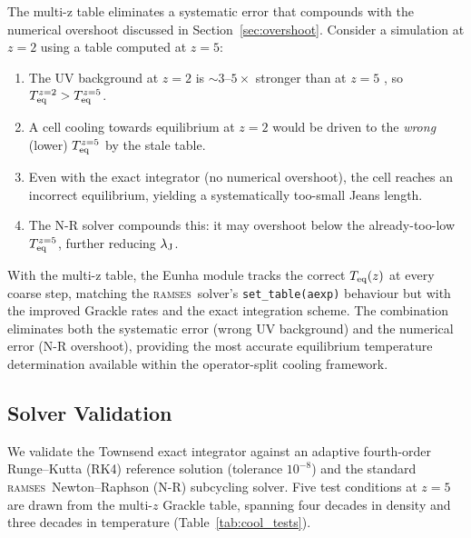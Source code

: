 \documentclass[fleqn,usenatbib]{mnras}
\newcommand{\lJ}{\lambda_{\rm J}}
\newcommand{\ramses}{\textsc{ramses}}
\newcommand{\code}[1]{\texttt{#1}}
\begin{document}
The multi-z table eliminates a systematic error that compounds with the
numerical overshoot discussed in Section~\ref{sec:overshoot}.  Consider
a simulation at $z = 2$ using a table computed at $z = 5$:

\begin{enumerate}
  \item The UV background at $z = 2$ is $\sim 3$--$5\times$ stronger
    than at $z = 5$ \citep{HM2012}, so
    $T_{\rm eq}^{z=2} > T_{\rm eq}^{z=5}$.
  \item A cell cooling towards equilibrium at $z = 2$ would be driven
    to the \emph{wrong} (lower) $T_{\rm eq}^{z=5}$ by the stale table.
  \item Even with the exact integrator (no numerical overshoot), the
    cell reaches an incorrect equilibrium, yielding a systematically
    too-small Jeans length.
  \item The N-R solver compounds this: it may overshoot below the
    already-too-low $T_{\rm eq}^{z=5}$, further reducing $\lJ$.
\end{enumerate}

With the multi-z table, the Eunha module tracks the correct
$T_{\rm eq}(z)$ at every coarse step, matching the \ramses\ solver's
\code{set\_table(aexp)} behaviour but with the improved Grackle rates
and the exact integration scheme.  The combination eliminates both
the systematic error (wrong UV background) and the numerical error
(N-R overshoot), providing the most accurate equilibrium temperature
determination available within the operator-split cooling framework.


\subsection{Solver Validation}
\label{sec:cool_validation}

We validate the Townsend exact integrator against an adaptive
fourth-order Runge--Kutta (RK4) reference solution (tolerance
$10^{-8}$) and the standard \ramses\ Newton--Raphson (N-R) subcycling
solver.  Five test conditions at $z = 5$ are drawn from the multi-$z$
Grackle table, spanning four decades in density and three decades in
temperature (Table~\ref{tab:cool_tests}).
\end{document}

